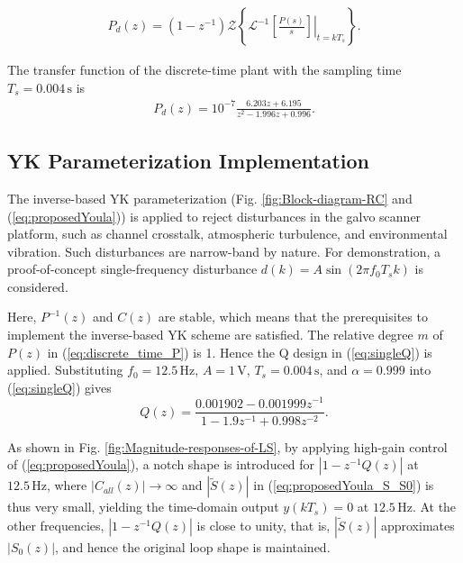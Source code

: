 \documentclass [11pt, proquest] {uwthesis}[2020/02/24]
\begin{document}
\begin{gather}
P_{d}(z)=(1-z^{-1})\mathcal{Z}\left\{ \mathcal{L}^{-1}\left.\left[\frac{P(s)}{s}\right]\right|_{t=kT_{s}}\right\} .\label{eq:zero_order-hold}
\end{gather}

The transfer function of the discrete-time plant with the sampling
time $T_{s}=0.004\,\text{s}$ is
\begin{gather}
P_{d}(z)=10^{-7}\frac{6.203z+6.195}{z^{2}-1.996z+0.996}.\label{eq:discrete_time_P}
\end{gather}

\subsection{YK Parameterization Implementation}

The inverse-based YK parameterization (Fig. \ref{fig:Block-diagram-RC}
and (\ref{eq:proposedYoula})) is applied to reject disturbances in
the galvo scanner platform, such as channel crosstalk, atmospheric
turbulence, and environmental vibration. Such disturbances are narrow-band
by nature. For demonstration, a proof-of-concept single-frequency
disturbance $d(k)=A\sin(2\pi f_{0}T_{s}k)$ is considered. 

Here, $P^{-1}(z)$ and $C(z)$ are stable, which means that the prerequisites
to implement the inverse-based YK scheme are satisfied. The relative
degree $m$ of $P(z)$ in (\ref{eq:discrete_time_P}) is 1. Hence
the Q design in (\ref{eq:singleQ}) is applied. Substituting $f_{0}=12.5\,\text{Hz}$,
$A=1\,\text{V}$, $T_{s}=0.004\,\text{s}$, and $\alpha=0.999$ into
(\ref{eq:singleQ}) gives
\begin{equation}
Q(z)=\frac{0.001902-0.001999z^{-1}}{1-1.9z^{-1}+0.998z^{-2}}.\label{eq:singleQ-1}
\end{equation}

As shown in Fig. \ref{fig:Magnitude-responses-of-LS}, by applying high-gain
control of (\ref{eq:proposedYoula}), a notch shape is introduced
for $\left|1-z^{-1}Q(z)\right|$ at $12.5\,\text{Hz}$, where $\left|C_{all}(z)\right|\rightarrow\infty$
and $\left|\tilde{S}(z)\right|$ in (\ref{eq:proposedYoula_S_S0})
is thus very small, yielding the time-domain output $y(kT_{s})=0$
at $12.5\,\text{Hz}$. At the other frequencies, $\left|1-z^{-1}Q(z)\right|$
is close to unity, that is, $\left|\tilde{S}(z)\right|$ approximates
$\left|S_{0}(z)\right|$, and hence the original loop shape is maintained.
\end{document}
